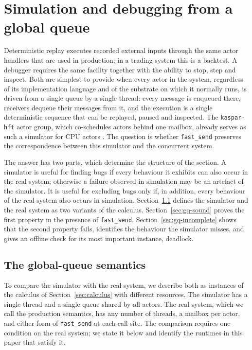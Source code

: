 \documentclass[11pt]{article}
\theoremstyle{definition}
\theoremstyle{remark}
\newcommand{\fs}{\texttt{fast\_send}}
\newcommand{\kh}{\texttt{kaspar-hft}}
\begin{document}
\section{Simulation and debugging from a global queue}
\label{sec:debug}

Deterministic replay executes recorded external inputs through the same actor handlers
that are used in production; in a trading system this is a backtest. A debugger requires
the same facility together with the ability to stop, step and inspect. Both are simplest
to provide when every actor in the system, regardless of its implementation language and
of the substrate on which it normally runs, is driven from a single queue by a single
thread: every message is enqueued there, receivers dequeue their messages from it, and
the execution is a single deterministic sequence that can be replayed, paused and
inspected. The \kh{} actor group, which co-schedules actors behind one mailbox, already
serves as such a simulator for CPU actors \cite{mayeski2026fastsend}. The question
is whether \fs{} preserves the correspondence between this simulator and the concurrent
system.

The answer has two parts, which determine the structure of the section. A simulator is
useful for finding bugs if every behaviour it exhibits can also occur in the real
system; otherwise a failure observed in simulation may be an artefact of the simulator.
It is useful for excluding bugs only if, in addition, every behaviour of the real system
also occurs in simulation. Section~\ref{sec:gq-sem} defines the simulator and the real
system as two variants of the calculus. Section~\ref{sec:gq-sound} proves the first
property in the presence of \fs{}. Section~\ref{sec:gq-incomplete} shows that the second
property fails, identifies the behaviour the simulator misses, and gives an offline check
for its most important instance, deadlock.

\subsection{The global-queue semantics}
\label{sec:gq-sem}

To compare the simulator with the real system, we describe both as instances of the
calculus of Section~\ref{sec:calculus} with different resources. The simulator has a
single thread and a single queue shared by all actors. The real system, which we call
the production semantics, has any number of threads, a mailbox per actor, and either form
of \fs{} at each call site. The comparison requires one condition on the real system; we
state it below and identify the runtimes in this paper that satisfy it.
\end{document}
